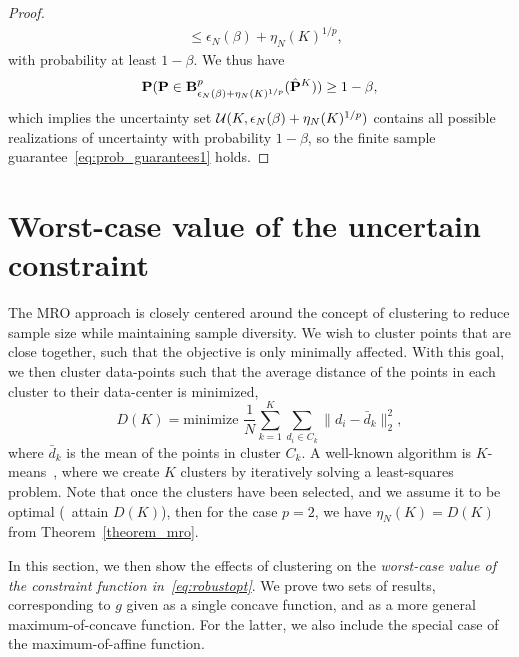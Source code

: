 \documentclass[12pt]{article}
\newcommand{\citep}{\cite}
\theoremstyle{thmstyleone}%
\theoremstyle{thmstyletwo}%
\theoremstyle{thmstylethree}%
\newcommand{\reviewChanges}{}
\begin{document}
\begin{proof}
\begin{equation*}
\begin{aligned}
	&\leq \epsilon_N(\beta) + \eta_N(K)^{1/p},
\end{aligned}
	\end{equation*}
with probability at least $1 - \beta$. We thus have
\begin{equation*}
		{\mathbf P}({\mathbf P} \in \mathbf{B}_{\epsilon_N(\beta) + \eta_N(K)^{1/p}}^p (\hat{{\mathbf P}}^K) )\geq 1 - \beta,
	\end{equation*}
which implies the uncertainty set ${\mathcal{U}}(K, \epsilon_N(\beta) + \eta_N(K)^{1/p})$ contains all possible realizations of uncertainty with probability $1-\beta$, so the finite sample guarantee~\eqref{eq:prob_guarantees1} holds.
\end{proof}


\section{Worst-case value of the uncertain constraint}
\label{sec:conservatism}
The \gls{MRO} approach is closely centered around the concept of clustering to reduce sample size while maintaining sample diversity.
We wish to cluster points that are close together, such that the objective is only minimally affected.
With this goal, we then cluster data-points such that the average distance of the points in each cluster to their data-center is minimized,
\begin{equation*}
D(K) = \text{minimize } \frac{1}{N}\sum_{k=1}^K \sum_{d_i \in C_k} \| d_i - \bar{d}_k \|^2_2,
\end{equation*}
where $\bar{d}_k$ is the mean of the points in cluster $C_k$.
A well-known algorithm is $K$-means~\citep{kmeans}, where we create $K$ clusters by iteratively solving a least-squares problem.
\reviewChanges{
Note that once the clusters have been selected, and we assume it to be optimal (\ie~attain $D(K)$), then for the case $p=2$, we have $\eta_N(K) = D(K)$ from Theorem~\ref{theorem_mro}.}

In this section, we then show the effects of clustering on the {\it worst-case value of the constraint function in~\eqref{eq:robustopt}}.
\reviewChanges{We prove two sets of results, corresponding to $g$ given as a single concave function, and as a more general maximum-of-concave function. For the latter, we also include the special case of the maximum-of-affine function.}
\end{document}
